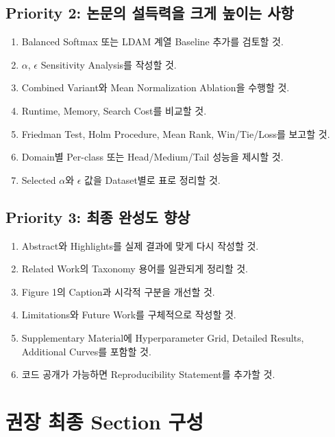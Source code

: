 \documentclass[11pt,a4paper]{article}
\begin{document}
\subsection{Priority 2: 논문의 설득력을 크게 높이는 사항}

\begin{enumerate}
\item Balanced Softmax 또는 LDAM 계열 Baseline 추가를 검토할 것.
\item \(\alpha\), \(\epsilon\) Sensitivity Analysis를 작성할 것.
\item Combined Variant와 Mean Normalization Ablation을 수행할 것.
\item Runtime, Memory, Search Cost를 비교할 것.
\item Friedman Test, Holm Procedure, Mean Rank, Win/Tie/Loss를 보고할 것.
\item Domain별 Per-class 또는 Head/Medium/Tail 성능을 제시할 것.
\item Selected \(\alpha\)와 \(\epsilon\) 값을 Dataset별로 표로 정리할 것.
\end{enumerate}

\subsection{Priority 3: 최종 완성도 향상}

\begin{enumerate}
\item Abstract와 Highlights를 실제 결과에 맞게 다시 작성할 것.
\item Related Work의 Taxonomy 용어를 일관되게 정리할 것.
\item Figure 1의 Caption과 시각적 구분을 개선할 것.
\item Limitations와 Future Work를 구체적으로 작성할 것.
\item Supplementary Material에 Hyperparameter Grid, Detailed Results, Additional Curves를 포함할 것.
\item 코드 공개가 가능하면 Reproducibility Statement를 추가할 것.
\end{enumerate}

\section{권장 최종 Section 구성}
\end{document}
